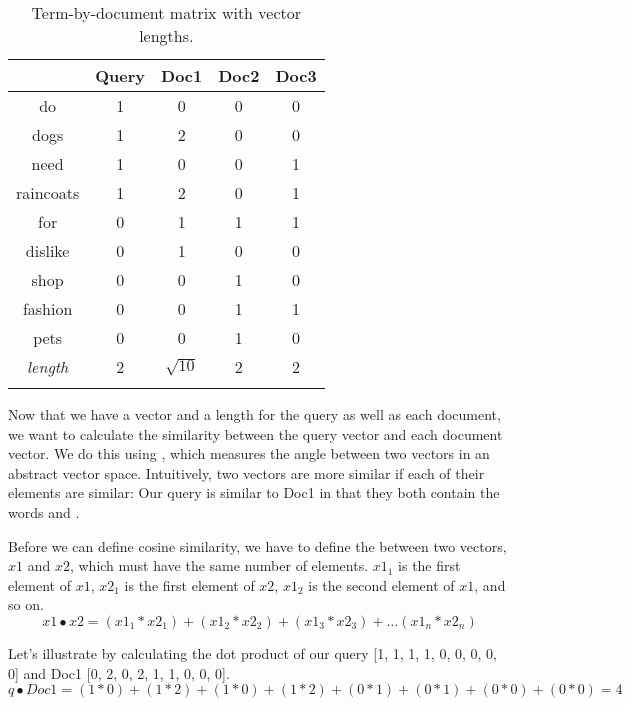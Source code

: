 \begin{table}
\begin{tabular}{c c c c c } 
\lsptoprule
  & Query & Doc1 & Doc2 & Doc3  \\ \midrule
  do & 1 	& 0 		& 0 	& 0  \\
  dogs & 1 & 2 & 0 & 0 \\
  need & 1 & 0 & 0  & 1 \\
  raincoats & 1 & 2 & 0 & 1 \\
  for & 0 & 1 & 1 & 1 \\
  dislike & 0 & 1 & 0 & 0 \\
  shop & 0 & 0 & 1 & 0 \\
  fashion & 0 & 0 & 1 & 1 \\
  pets & 0 & 0 & 1 & 0 \\ \addlinespace
  \emph{length} & 2 & $\sqrt{10}$ & 2 & 2 \\
\lspbottomrule
\end{tabular}
\caption{Term-by-document matrix with vector lengths.}
\label{termdocdog2}
\end{table}

Now that we have a vector and a length for the query as well as each document, we want to calculate the similarity between the query vector and each document vector.  We do this using , which measures the angle between two vectors in an abstract vector space.  Intuitively, two vectors are more similar if each of their elements are similar: Our query is similar to Doc1 in that they both contain the words  and .

Before we can define cosine similarity, we have to define the  between two vectors, $x1$ and $x2$, which must have the same number of elements. $x1_{1}$ is the first element of $x1$, $x2_{1}$ is the first element of $x2$, $x1_{2}$ is the second element of $x1$, and so on. 
\begin{equation}
  x1 \bullet x2 = (x1_{1} * x2_{1}) + (x1_{2} * x2_{2}) + (x1_{3} * x2_{3}) + \ldots (x1_{n} * x2_{n})
\end{equation}

Let's illustrate by calculating the dot product of our query [1, 1, 1, 1, 0, 0, 0, 0, 0] and Doc1 [0, 2, 0, 2, 1, 1, 0, 0, 0].
\begin{equation}
 q \bullet Doc1 = (1 * 0) + (1 * 2) + (1 * 0) + (1 * 2) + (0 * 1) + (0 * 1) + (0 * 0) +( 0 * 0) = 4 
\end{equation}


